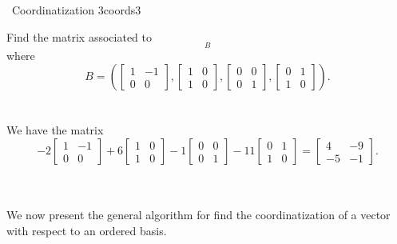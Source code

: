         \begin{example}{\Difficulty\,\Difficulty\,\,Coordinatization 3}{coords3}

            Find the matrix associated to
            \begin{equation*}
                [-2,6,-1,-11]_B
            \end{equation*}
            where
            \begin{equation*}
                B=\left(\begin{bmatrix} 1 & -1 \\ 0 & 0 \end{bmatrix},\begin{bmatrix} 1 & 0 \\ 1 & 0 \end{bmatrix},\begin{bmatrix} 0 & 0 \\ 0 & 1 \end{bmatrix},\begin{bmatrix} 0 & 1 \\ 1 & 0 \end{bmatrix}\right).
            \end{equation*}
            \\
            \\
            We have the matrix
            \begin{equation*}
                -2\begin{bmatrix} 1 & -1 \\ 0 & 0 \end{bmatrix}+6\begin{bmatrix} 1 & 0 \\ 1 & 0 \end{bmatrix}-1\begin{bmatrix} 0 & 0 \\ 0 & 1 \end{bmatrix}-11\begin{bmatrix} 0 & 1 \\ 1 & 0 \end{bmatrix}=\begin{bmatrix} 4 & -9 \\ -5 & -1 \end{bmatrix}.
            \end{equation*}

        \end{example}
        \vphantom
        \\
        \\
        We now present the general algorithm for find the coordinatization of a vector with respect to an ordered basis.
